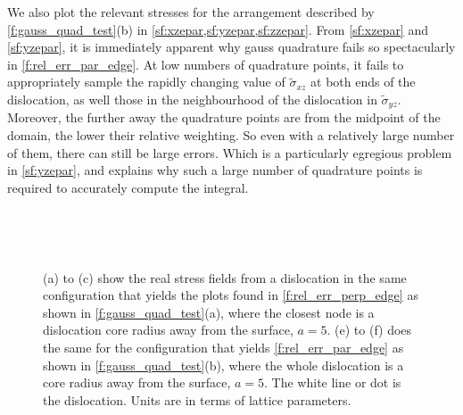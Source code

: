 We also plot the relevant stresses for the arrangement described by \cref{f:gauss_quad_test}(b) in \cref{sf:xzepar,sf:yzepar,sf:zzepar}. From \cref{sf:xzepar} and \cref{sf:yzepar}, it is immediately apparent why gauss quadrature fails so spectacularly in \cref{f:rel_err_par_edge}. At low numbers of quadrature points, it fails to appropriately sample the rapidly changing value of $\tilde{\sigma}_{xz}$ at both ends of the dislocation, as well those in the neighbourhood of the dislocation in $\tilde{\sigma}_{yz}$. Moreover, the further away the quadrature points are from the midpoint of the domain, the lower their relative weighting. So even with a relatively large number of them, there can still be large errors. Which is a particularly egregious problem in \cref{sf:yzepar}, and explains why such a large number of quadrature points is required to accurately compute the integral.
\begin{figure}
    \centering
    ~
    ~

    ~
    ~
    \caption[Symmetry in stress fields leads more accurate numeric tractions.]{(a) to (c) show the real stress fields from a dislocation in the same configuration that yields the plots found in \cref{f:rel_err_perp_edge} as shown in \cref{f:gauss_quad_test}(a), where the closest node is a dislocation core radius away from the surface, $a = 5$. (e) to (f) does the same for the configuration that yields \cref{f:rel_err_par_edge} as shown in \cref{f:gauss_quad_test}(b), where the whole dislocation is a core radius away from the surface, $a = 5$. The white line or dot is the dislocation. Units are in terms of lattice parameters.}
    \label{f:sigma_edge_test_config}
\end{figure}

